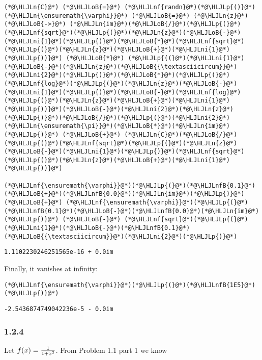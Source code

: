 \documentclass[12pt,a4paper]{article}
\newcommand{\HLJLn}[1]{#1}
\newcommand{\HLJLnf}[1]{\textcolor[RGB]{66,102,213}{#1}}
\newcommand{\HLJLnfB}[1]{\textcolor[RGB]{59,151,46}{#1}}
\newcommand{\HLJLni}[1]{\textcolor[RGB]{59,151,46}{#1}}
\newcommand{\HLJLoB}[1]{\textcolor[RGB]{102,102,102}{\textbf{#1}}}
\newcommand{\HLJLp}[1]{#1}
\begin{document}
\begin{lstlisting}
(*@\HLJLn{C}@*) (*@\HLJLoB{=}@*) (*@\HLJLnf{randn}@*)(*@\HLJLp{()}@*)
(*@\HLJLn{\ensuremath{\varphi}}@*) (*@\HLJLoB{=}@*) (*@\HLJLn{z}@*) (*@\HLJLoB{->}@*) (*@\HLJLn{im}@*)(*@\HLJLoB{/}@*)(*@\HLJLp{(}@*)(*@\HLJLnf{sqrt}@*)(*@\HLJLp{(}@*)(*@\HLJLn{z}@*)(*@\HLJLoB{-}@*)(*@\HLJLni{1}@*)(*@\HLJLp{)}@*)(*@\HLJLoB{*}@*)(*@\HLJLnf{sqrt}@*)(*@\HLJLp{(}@*)(*@\HLJLn{z}@*)(*@\HLJLoB{+}@*)(*@\HLJLni{1}@*)(*@\HLJLp{))}@*) (*@\HLJLoB{*}@*) (*@\HLJLp{((}@*)(*@\HLJLni{1}@*)(*@\HLJLoB{-}@*)(*@\HLJLn{z}@*)(*@\HLJLoB{{\textasciicircum}}@*)(*@\HLJLni{2}@*)(*@\HLJLp{)}@*)(*@\HLJLoB{*}@*)(*@\HLJLp{(}@*)(*@\HLJLnf{log}@*)(*@\HLJLp{(}@*)(*@\HLJLn{z}@*)(*@\HLJLoB{-}@*)(*@\HLJLni{1}@*)(*@\HLJLp{)}@*)(*@\HLJLoB{-}@*)(*@\HLJLnf{log}@*)(*@\HLJLp{(}@*)(*@\HLJLn{z}@*)(*@\HLJLoB{+}@*)(*@\HLJLni{1}@*)(*@\HLJLp{))}@*)(*@\HLJLoB{-}@*)(*@\HLJLni{2}@*)(*@\HLJLn{z}@*)(*@\HLJLp{)}@*)(*@\HLJLoB{/}@*)(*@\HLJLp{(}@*)(*@\HLJLni{2}@*)(*@\HLJLn{\ensuremath{\pi}}@*)(*@\HLJLoB{*}@*)(*@\HLJLn{im}@*)(*@\HLJLp{)}@*) (*@\HLJLoB{+}@*) (*@\HLJLn{C}@*)(*@\HLJLoB{/}@*)(*@\HLJLp{(}@*)(*@\HLJLnf{sqrt}@*)(*@\HLJLp{(}@*)(*@\HLJLn{z}@*)(*@\HLJLoB{-}@*)(*@\HLJLni{1}@*)(*@\HLJLp{)}@*)(*@\HLJLnf{sqrt}@*)(*@\HLJLp{(}@*)(*@\HLJLn{z}@*)(*@\HLJLoB{+}@*)(*@\HLJLni{1}@*)(*@\HLJLp{))}@*)

(*@\HLJLnf{\ensuremath{\varphi}}@*)(*@\HLJLp{(}@*)(*@\HLJLnfB{0.1}@*)(*@\HLJLoB{+}@*)(*@\HLJLnfB{0.0}@*)(*@\HLJLn{im}@*)(*@\HLJLp{)}@*) (*@\HLJLoB{+}@*) (*@\HLJLnf{\ensuremath{\varphi}}@*)(*@\HLJLp{(}@*)(*@\HLJLnfB{0.1}@*)(*@\HLJLoB{-}@*)(*@\HLJLnfB{0.0}@*)(*@\HLJLn{im}@*)(*@\HLJLp{)}@*) (*@\HLJLoB{-}@*) (*@\HLJLnf{sqrt}@*)(*@\HLJLp{(}@*)(*@\HLJLni{1}@*)(*@\HLJLoB{-}@*)(*@\HLJLnfB{0.1}@*)(*@\HLJLoB{{\textasciicircum}}@*)(*@\HLJLni{2}@*)(*@\HLJLp{)}@*)
\end{lstlisting}

\begin{lstlisting}
1.1102230246251565e-16 + 0.0im
\end{lstlisting}


Finally, it vanishes at infinity:


\begin{lstlisting}
(*@\HLJLnf{\ensuremath{\varphi}}@*)(*@\HLJLp{(}@*)(*@\HLJLnfB{1E5}@*)(*@\HLJLp{)}@*)
\end{lstlisting}

\begin{lstlisting}
-2.5436874749042236e-5 - 0.0im
\end{lstlisting}


\subsubsection{1.2.4}
Let $f(x) = {1 \over 1+x^2}$. From Problem 1.1 part 1 we know
\end{document}
